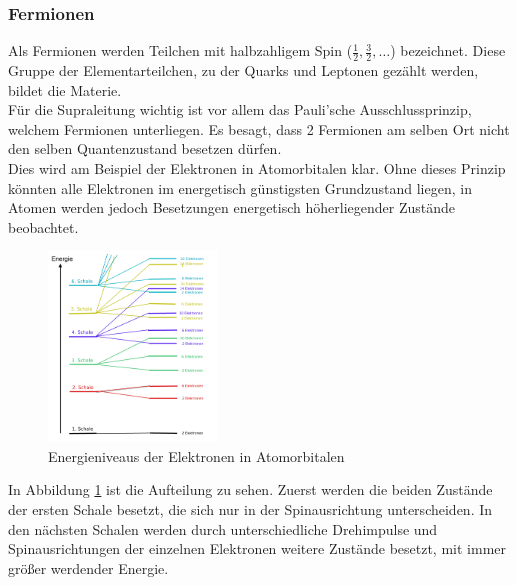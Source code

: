         \subsubsection{Fermionen}
Als Fermionen werden Teilchen mit halbzahligem Spin ($\frac{1}{2}, \frac{3}{2},
\dots$) bezeichnet. Diese Gruppe der Elementarteilchen, zu der Quarks und 
Leptonen gezählt werden, bildet die Materie.
\vspace{3pt}\\
Für die Supraleitung wichtig ist vor allem das Pauli'sche Ausschlussprinzip, 
welchem Fermionen unterliegen. Es besagt, dass 2 Fermionen am selben Ort nicht
den selben Quantenzustand besetzen dürfen.\\
Dies wird am Beispiel der Elektronen in Atomorbitalen klar. Ohne dieses Prinzip
könnten alle Elektronen im energetisch günstigsten Grundzustand liegen, in Atomen
werden jedoch Besetzungen energetisch höherliegender Zustände beobachtet.
\begin{figure}[h]
    \centering
    \includegraphics[width=0.4\textwidth]{Abb/energieniveaus-elektronen.jpg}
	\caption{Energieniveaus der Elektronen in Atomorbitalen \cite{energieniveaus}}
    \label{Abb:energieschema}
\end{figure}
In Abbildung \ref{Abb:energieschema} ist die Aufteilung zu sehen. Zuerst werden die
beiden Zustände der ersten Schale besetzt, die sich nur in der Spinausrichtung 
unterscheiden. In den nächsten Schalen werden durch unterschiedliche Drehimpulse 
und Spinausrichtungen der einzelnen Elektronen weitere Zustände besetzt, mit immer
größer werdender Energie. \cite{fermionwiki}

